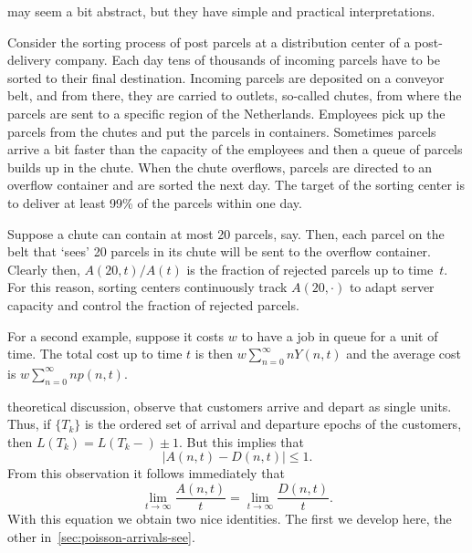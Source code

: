  may seem a bit abstract, but they have simple and practical interpretations.

Consider the sorting process of post parcels at a distribution center of a post-delivery company.
Each day tens of thousands of incoming parcels have to be sorted to their final destination.
Incoming parcels are deposited on a conveyor belt, and from there, they are carried to outlets, so-called chutes, from where the parcels are sent to a specific region of the Netherlands.
Employees pick up the parcels from the chutes and put the parcels in containers.
Sometimes parcels arrive a bit faster than the capacity of the employees and then a queue of parcels builds up in the chute.
When the chute overflows, parcels are directed to an overflow container and are sorted the next day.
The target of the sorting center is to deliver at least 99\% of the parcels within one day.

Suppose a chute can contain at most 20 parcels, say.
Then, each parcel on the belt that `sees' 20 parcels in its chute will be sent to the overflow container.
Clearly then, $A(20,t)/A(t)$ is the fraction of rejected parcels up to time~$t$.
For this reason,  sorting centers continuously track $A(20,\cdot)$ to adapt server capacity and control the fraction of rejected parcels.

For a second example, suppose it costs $w$ to have a job in queue for a unit of time.
The total cost up to time $t$ is then $w \sum_{n=0}^\infty n Y(n,t)$ and the average cost is
$w \sum_{n=0}^\infty n p(n,t)$.


 theoretical discussion, observe that customers arrive and depart as single units.
Thus, if $\{T_k\}$ is the ordered set of arrival and departure epochs of the customers, then $L(T_k) = L(T_k-) \pm 1$.
But this implies that
\begin{equation}\label{eq:97}
|A(n,t) - D(n,t)| \leq 1.
\end{equation}
From this observation it follows immediately that
\begin{equation}\label{eq:15}
 \lim_{t\to\infty} \frac{A(n,t)}t = \lim_{t\to\infty} \frac{D(n,t)}t.
\end{equation}
With this equation we obtain two nice identities.
The first we develop here, the other in~\cref{sec:poisson-arrivals-see}.

